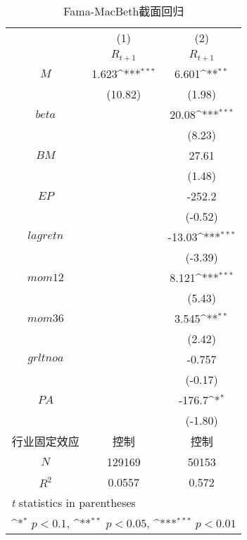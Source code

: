 \begin{table}[htbp]\centering
\def\sym#1{\ifmmode^{#1}\else\(^{#1}\)\fi}
\caption{Fama-MacBeth截面回归}
\label{fmb}
\begin{tabular*}{0.85\hsize}{@{\hskip\tabcolsep\extracolsep\fill}*{3}{c}}
\toprule
        &\multicolumn{1}{c}{(1)}&\multicolumn{1}{c}{(2)}\\
 &\multicolumn{1}{c}{$R_{t+1}$}&\multicolumn{1}{c}{$R_{t+1}$}\\
\midrule
$M$         &    1.623\sym{***}&    6.601\sym{**} \\
          &  (10.82)         &   (1.98)         \\
$beta  $    &                  &    20.08\sym{***}\\
          &                  &   (8.23)         \\
$BM  $      &                  &    27.61         \\
          &                  &   (1.48)         \\
$EP  $      &                  &   -252.2         \\
          &                  &  (-0.52)         \\
$lagretn $  &                  &   -13.03\sym{***}\\
          &                  &  (-3.39)         \\
$mom12  $   &                  &    8.121\sym{***}\\
          &                  &   (5.43)         \\
$mom36  $   &                  &    3.545\sym{**} \\
          &                  &   (2.42)         \\
$grltnoa $  &                  &   -0.757         \\
          &                  &  (-0.17)         \\
$PA   $     &                  &   -176.7\sym{*}  \\
          &                  &  (-1.80)         \\
行业固定效应&    控制   &    控制   \\
\midrule
$N$         &   129169         &    50153     \\
$R^2$        &   0.0557         &    0.572     \\
\bottomrule
\multicolumn{3}{l}{\footnotesize \textit{t} statistics in parentheses}\\
\multicolumn{3}{l}{\footnotesize \sym{*} \(p<0.1\), \sym{**} \(p<0.05\), \sym{***} \(p<0.01\)}\\
\end{tabular*}
\end{table}

